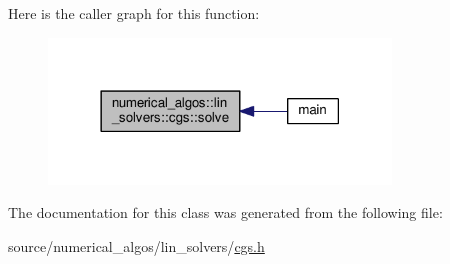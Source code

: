 Here is the caller graph for this function\-:\nopagebreak
\begin{figure}[H]
\begin{center}
\leavevmode
\includegraphics[width=258pt]{classnumerical__algos_1_1lin__solvers_1_1cgs_a76503cf7b66739a4fa4571f034aa960e_icgraph}
\end{center}
\end{figure}




The documentation for this class was generated from the following file\-:\begin{DoxyCompactItemize}
\item 
source/numerical\-\_\-algos/lin\-\_\-solvers/\hyperlink{cgs_8h}{cgs.\-h}\end{DoxyCompactItemize}
